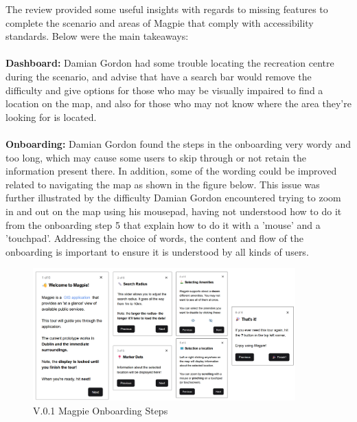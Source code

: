 \newpage
\noindent The review provided some useful insights with regards to missing features to complete the scenario and areas of Magpie that comply with accessibility standards. Below were the main takeaways:\\\\
\textbf{Dashboard: }
Damian Gordon had some trouble locating the recreation centre during the scenario, and advise that have a search bar would remove the difficulty and give options for those who may be visually impaired to find a location on the map, and also for those who may not know where the area they're looking for is located.\\\\
\textbf{Onboarding: }
Damian Gordon found the steps in the onboarding very wordy and too long, which may cause some users to skip through or not retain the information present there. In addition, some of the wording could be improved related to navigating the map as shown in the figure below. This issue was further illustrated by the difficulty Damian Gordon encountered trying to zoom in and out on the map using his mousepad, having not understood how to do it from the onboarding step 5 that explain how to do it with a 'mouse' and a 'touchpad'. Addressing the choice of words, the content and flow of the onboarding is important to ensure it is understood by all kinds of users.\\
\begin{figure}[h!]
    \centering
    \includegraphics[width=0.9\textwidth]{images/onboarding-text-v1.png}
    \caption{V.0.1 Magpie Onboarding Steps}
\end{figure}

